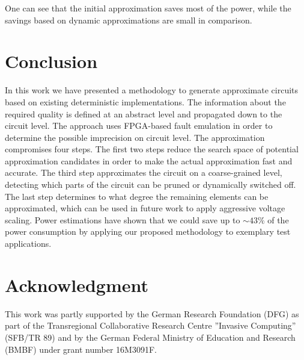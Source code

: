 \documentclass[conference]{IEEEtran}
\begin{document}
One can see that the initial approximation saves most of the power, while the savings based on dynamic approximations are small in comparison. 

\section{Conclusion}
\label{sec:conclusion}
In this work we have presented a methodology to generate approximate circuits based on existing deterministic implementations. The information about the required quality is defined at an abstract level and propagated down to the circuit level. The approach uses FPGA-based fault emulation in order to determine the possible imprecision on circuit level. The approximation compromises four steps. The first two steps reduce the search space of potential approximation candidates in order to make the actual approximation fast and accurate. The third step approximates the circuit on a coarse-grained level, detecting which parts of the circuit can be pruned or dynamically switched off. The last step determines to what degree the remaining elements can be approximated, which can be used in future work to apply aggressive voltage scaling. Power estimations have shown that we could save up to $\sim43\%$ of the power consumption by applying our proposed methodology to exemplary test applications.





\section*{Acknowledgment}
This work was partly supported by the German Research Foundation (DFG) as part of the Transregional Collaborative Research Centre ”Invasive Computing” (SFB/TR 89) and by the German Federal Ministry of Education and Research (BMBF) under grant number 16M3091F.




\newpage








\end{document}

